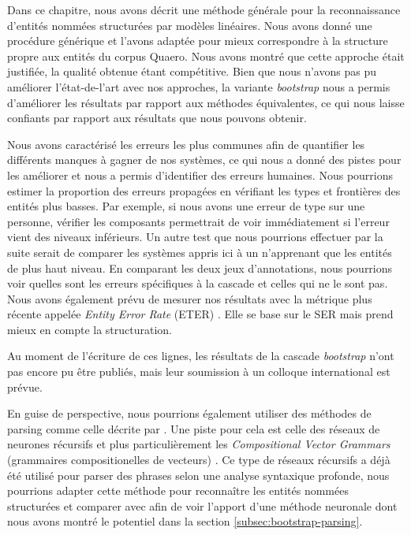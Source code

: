 \documentclass[PhD-Yoann-Dupont.tex]{subfiles}
\begin{document}
Dans ce chapitre, nous avons décrit une méthode générale pour la reconnaissance d'entités nommées structurées par modèles linéaires. Nous avons donné une procédure générique et l'avons adaptée pour mieux correspondre à la structure propre aux entités du corpus Quaero. Nous avons montré que cette approche était justifiée, la qualité obtenue étant compétitive. Bien que nous n'avons pas pu améliorer l'état-de-l'art avec nos approches, la variante \emph{bootstrap} nous a permis d'améliorer les résultats par rapport aux méthodes équivalentes, ce qui nous laisse confiants par rapport aux résultats que nous pouvons obtenir.

Nous avons caractérisé les erreurs les plus communes afin de quantifier les différents manques à gagner de nos systèmes, ce qui nous a donné des pistes pour les améliorer et nous a permis d'identifier des erreurs humaines. Nous pourrions estimer la proportion des erreurs propagées en vérifiant les types et frontières des entités plus basses. Par exemple, si nous avons une erreur de type sur une personne, vérifier les composants permettrait de voir immédiatement si l'erreur vient des niveaux inférieurs. Un autre test que nous pourrions effectuer par la suite serait de comparer les systèmes appris ici à un n'apprenant que les entités de plus haut niveau. En comparant les deux jeux d'annotations, nous pourrions voir quelles sont les erreurs spécifiques à la cascade et celles qui ne le sont pas. Nous avons également prévu de mesurer nos résultats avec la métrique plus récente appelée \textit{Entity Error Rate} (ETER) \cite{jannet2014eter}. Elle se base sur le SER mais prend mieux en compte la structuration.

Au moment de l'écriture de ces lignes, les résultats de la cascade \emph{bootstrap} n'ont pas encore pu être publiés, mais leur soumission à un colloque international est prévue.

En guise de perspective, nous pourrions également utiliser des méthodes de parsing comme celle décrite par \citet{dinarelli2012}. Une piste pour cela est celle des réseaux de neurones récursifs \citep{socher2011parsing} et plus particulièrement les \textit{Compositional Vector Grammars} (grammaires compositionelles de vecteurs) \citep{socher2013parsing}. Ce type de réseaux récursifs a déjà été utilisé pour parser des phrases selon une analyse syntaxique profonde, nous pourrions adapter cette méthode pour reconnaître les entités nommées structurées et comparer avec \citet{dinarelli2012} afin de voir l'apport d'une méthode neuronale dont nous avons montré le potentiel dans la section \ref{subsec:bootstrap-parsing}.
\end{document}
